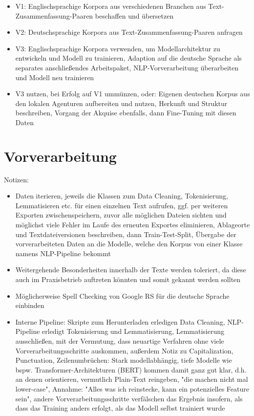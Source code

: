\begin{itemize}
	\item V1: Englischsprachige Korpora aus verschiedenen Branchen aus Text-Zusammenfassung-Paaren beschaffen und übersetzen
	\item V2: Deutschsprachige Korpora aus Text-Zusammenfassung-Paaren anfragen
	\item V3: Englischsprachige Korpora verwenden, um Modellarchitektur zu entwickeln und Modell zu trainieren, Adaption auf die deutsche Sprache als separates anschließendes Arbeitspaket, NLP-Vorverarbeitung überarbeiten und Modell neu trainieren
	\item V3 nutzen, bei Erfolg auf V1 ummünzen, oder: Eigenen deutschen Korpus aus den lokalen Agenturen aufbereiten und nutzen, Herkunft und Struktur beschreiben, Vorgang der Akquise ebenfalls, dann Fine-Tuning mit diesen Daten
\end{itemize}

\section{Vorverarbeitung}
Notizen:
\begin{itemize}
	\item Daten iterieren, jeweils die Klassen zum Data Cleaning, Tokenisierung, Lemmatisieren etc. für einen einzelnen Text aufrufen, ggf. per weiteren Exporten zwischenspeichern, zuvor alle möglichen Dateien sichten und möglichst viele Fehler im Laufe des erneuten Exportes eliminieren, Ablageorte und Textdateiversionen beschreiben, dann Train-Test-Split, Übergabe der vorverarbeiteten Daten an die Modelle, welche den Korpus von einer Klasse namens NLP-Pipeline bekommt
	\item Weitergehende Besonderheiten innerhalb der Texte werden toleriert, da diese auch im Praxisbetrieb auftreten könnten und somit gekannt werden sollten
	\item Möglicherweise Spell Checking von Google RS für die deutsche Sprache einbinden
	\item Interne Pipeline: Skripte zum Herunterladen erledigen Data Cleaning, NLP-Pipeline erledigt Tokenisierung und Lemmatisierung, Lemmatisierung ausschließen, mit der Vermutung, dass neuartige Verfahren ohne viele Vorverarbeitungsschritte auskommen, außerdem Notiz zu Capitalization, Punctuation, Zeilenumbrüchen: Stark modellabhängig, tiefe Modelle wie bspw. Transformer-Architekturen (BERT) kommen damit ganz gut klar, d.h. an denen orientieren, vermutlich Plain-Text reingeben, "die machen nicht mal lower-case", Annahme: "Alles was ich reinstecke, kann ein potenzielles Feature sein", andere Vorverarbeitungsschritte verfälschen das Ergebnis insofern, als dass das Training anders erfolgt, als das Modell selbst trainiert wurde
\end{itemize}

